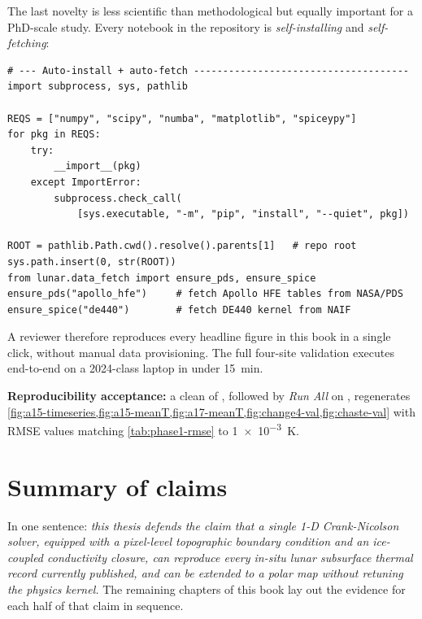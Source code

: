 The last novelty is less scientific than methodological but equally
important for a PhD-scale study.  Every notebook in the repository is
\emph{self-installing} and \emph{self-fetching}:

\begin{lstlisting}[caption={Bootstrap cell present at the top of every notebook.},label={lst:bootstrap}]
# --- Auto-install + auto-fetch -------------------------------------
import subprocess, sys, pathlib

REQS = ["numpy", "scipy", "numba", "matplotlib", "spiceypy"]
for pkg in REQS:
    try:
        __import__(pkg)
    except ImportError:
        subprocess.check_call(
            [sys.executable, "-m", "pip", "install", "--quiet", pkg])

ROOT = pathlib.Path.cwd().resolve().parents[1]   # repo root
sys.path.insert(0, str(ROOT))
from lunar.data_fetch import ensure_pds, ensure_spice
ensure_pds("apollo_hfe")     # fetch Apollo HFE tables from NASA/PDS
ensure_spice("de440")        # fetch DE440 kernel from NAIF
\end{lstlisting}

A reviewer therefore reproduces every headline figure in this book in
a single click, without manual data provisioning.  The full four-site
validation executes end-to-end on a 2024-class laptop in under
\SI{15}{\minute}.

\begin{milestone}
\textbf{Reproducibility acceptance:} a clean  of
\repo, followed by \emph{Run All} on
, regenerates
\cref{fig:a15-timeseries,fig:a15-meanT,fig:a17-meanT,fig:change4-val,fig:chaste-val}
with RMSE values matching \cref{tab:phase1-rmse} to
\SI{1e-3}{\kelvin}.
\end{milestone}

\section{Summary of claims}

In one sentence: \emph{this thesis defends the claim that a single
1-D Crank-Nicolson solver, equipped with a pixel-level topographic
boundary condition and an ice-coupled conductivity closure, can
reproduce every in-situ lunar subsurface thermal record currently
published, and can be extended to a polar map without retuning the
physics kernel.}  The remaining chapters of this book lay out the
evidence for each half of that claim in sequence.

